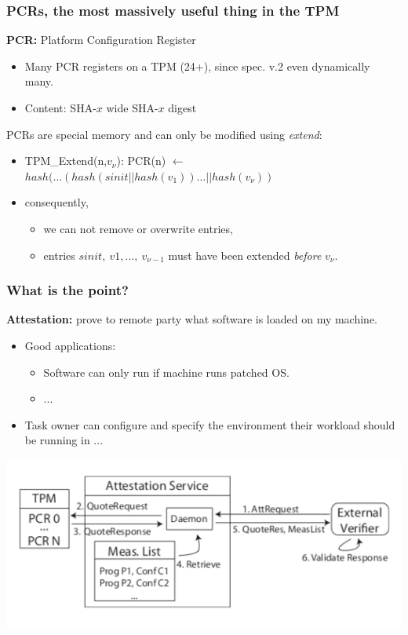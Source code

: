 \documentclass[aspectratio=169] {beamer}
\begin{document}
\begin{frame}\frametitle{PCRs, the most massively useful thing in the TPM}
	\textbf{PCR:} Platform Configuration Register
	\begin{itemize}
		\item Many PCR registers on a TPM (24+), since spec. v.2 even dynamically many.
		\item Content: SHA-$x$ wide SHA-$x$ digest
	\end{itemize}
	\vfill
	PCRs are special memory and can only be modified using \emph{extend}:
	\begin{itemize}
		\item TPM\_Extend(n,$v_{\nu}$): PCR(n) $\leftarrow$ $hash(\dots(hash(sinit||hash(v_1))\dots||hash(v_{\nu}))$ 
		\item consequently,
		\begin{itemize}
			\item we can not remove or overwrite entries,
			\item entries $sinit,\ v1,...,\ v_{\nu - 1}$ must have been extended \emph{before} $v_{\nu}$.
		\end{itemize}
	\end{itemize}
\end{frame}

\begin{frame}\frametitle{What is the point?}
\textbf{Attestation:} prove to remote party what software is loaded on my machine.
\begin{itemize}
	\item Good applications:
	\begin{itemize}
		\item Software can only run if machine runs patched OS.
		\item ...
	\end{itemize}
	\item Task owner can configure and specify the environment their workload should be running in ...
\end{itemize}
\vfill
\centering
\includegraphics[scale=.4]{bilder/attestation}
\end{frame}
\end{document}
